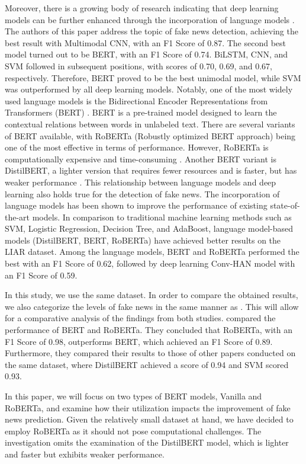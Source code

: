 Moreover, there is a growing body of research indicating that deep learning models can be further enhanced through the incorporation of language models \autocite{Conroy2015}. The authors of this paper address the topic of fake news detection, achieving the best result with Multimodal CNN, with an F1 Score of 0.87. The second best model turned out to be BERT, with an F1 Score of 0.74. BiLSTM, CNN, and SVM followed in subsequent positions, with scores of 0.70, 0.69, and 0.67, respectively. Therefore, BERT proved to be the best unimodal model, while SVM was outperformed by all deep learning models. Notably, one of the most widely used language models is the Bidirectional Encoder Representations from Transformers (BERT) \autocite{Devlin2018}. BERT is a pre-trained model designed to learn the contextual relations between words in unlabeled text. There are several variants of BERT available, with RoBERTa (Robustly optimized BERT approach) being one of the most effective in terms of performance. However, RoBERTa is computationally expensive and time-consuming \autocite{Liu2019}. Another BERT variant is DistilBERT, a lighter version that requires fewer resources and is faster, but has weaker performance \autocite{Sanh2019}. This relationship between language models and deep learning also holds true for the detection of fake news. The incorporation of language models has been shown to improve the performance of existing state-of-the-art models. In comparison to traditional machine learning methods such as SVM, Logistic Regression, Decision Tree, and AdaBoost, language model-based models (DistilBERT, BERT, RoBERTa) have achieved better results on the LIAR dataset. Among the language models, BERT and RoBERTa performed the best with an F1 Score of 0.62, followed by deep learning Conv-HAN model with an F1 Score of 0.59. 

In this study, we use the same dataset. In order to compare the obtained results, we also categorize the levels of fake news in the same manner as \autocite{Khan2021}. This will allow for a comparative analysis of the findings from both studies. \autocite{Joy2022} compared the performance of BERT and RoBERTa. They concluded that RoBERTa, with an F1 Score of 0.98, outperforms BERT, which achieved an F1 Score of 0.89. Furthermore, they compared their results to those of other papers conducted on the same dataset, where DistilBERT achieved a score of 0.94 and SVM scored 0.93.

In this paper, we will focus on two types of BERT models, Vanilla and RoBERTa, and examine how their utilization impacts the improvement of fake news prediction. Given the relatively small dataset at hand, we have decided to employ RoBERTa as it should not pose computational challenges. The investigation omits the examination of the DistilBERT model, which is lighter and faster but exhibits weaker performance.

